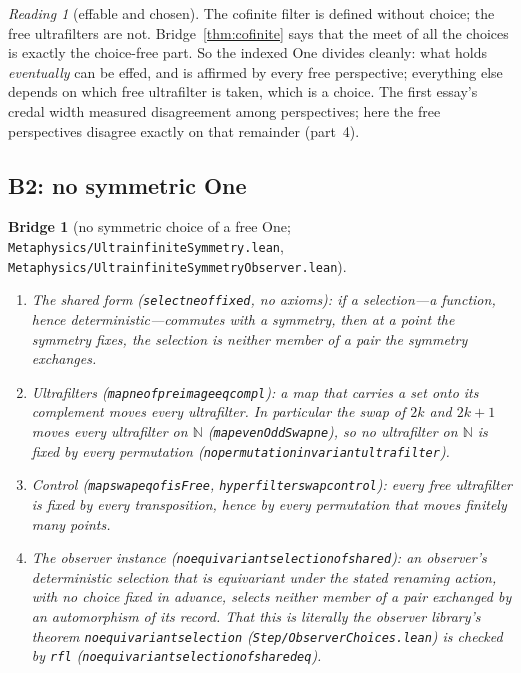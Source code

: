 \documentclass[]{article}
\newtheorem{bridge}[theorem]{Bridge}
\theoremstyle{definition}
\theoremstyle{remark}
\newtheorem{reading}[theorem]{Reading}
\newcommand{\codeus}{\textunderscore\allowbreak}
\newcommand{\code}[1]{\texttt{\let\_\codeus #1}}
\newcommand{\lpath}[1]{{\ttfamily\nolinkurl{#1}}}
\newcommand{\N}{\mathbb{N}}
\newcommand{\meta}[1]{\lpath{Metaphysics/#1.lean}}
\newcommand{\step}[1]{\lpath{Step/#1.lean}}
\begin{document}
\begin{reading}[effable and chosen]
\label{read:effable-core}
The cofinite filter is defined without choice; the free ultrafilters are not. Bridge~\ref{thm:cofinite}
says that the meet of all the choices is exactly the choice-free part. So the indexed One divides
cleanly: what holds \emph{eventually} can be effed, and is affirmed by every free perspective;
everything else depends on which free ultrafilter is taken, which is a choice. The first essay's
credal width measured disagreement among perspectives; here the free perspectives disagree exactly on
that remainder (part~4).
\end{reading}

\subsection{B2: no symmetric One}
\label{sec:symmetry}

\begin{bridge}[no symmetric choice of a free One; \meta{UltrainfiniteSymmetry}, \meta{UltrainfiniteSymmetryObserver}]
\label{thm:symmetry}
\leavevmode
\begin{enumerate}
\item \emph{The shared form} (\code{select\_ne\_of\_fixed}, no axioms): if a selection---a
  function, hence deterministic---commutes with a symmetry, then at a point the symmetry fixes, the
  selection is neither member of a pair the symmetry exchanges.
\item \emph{Ultrafilters} (\code{map\_ne\_of\_preimage\_eq\_compl}): a map that carries a set onto its
  complement moves every ultrafilter. In particular the swap of $2k$ and $2k+1$ moves every
  ultrafilter on $\N$ (\code{map\_evenOddSwap\_ne}), so \emph{no ultrafilter on $\N$ is fixed by every
  permutation} (\code{no\_permutation\_invariant\_ultrafilter}).
\item \emph{Control} (\code{map\_swap\_eq\_of\_isFree}, \code{hyperfilter\_swap\_control}): every free
  ultrafilter is fixed by every transposition, hence by every permutation that moves finitely many
  points.
\item \emph{The observer instance} (\code{no\_equivariant\_selection\_of\_shared}): an observer's
  deterministic selection that is equivariant under the stated renaming action, with no choice fixed
  in advance, selects neither member of a pair exchanged by an automorphism of its record. That this is literally the observer library's theorem
  \code{no\_equivariant\_selection} (\step{ObserverChoices}) is checked by \code{rfl}
  (\code{no\_equivariant\_selection\_of\_shared\_eq}).
\end{enumerate}
\end{bridge}
\end{document}
